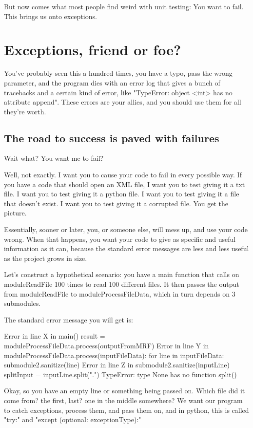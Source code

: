 \documentclass[10pt,a4paper]{article}
\begin{document}
But now comes what most people find weird with unit testing: You want to fail. This brings us onto exceptions.

\section{Exceptions, friend or foe?}

You've probably seen this a hundred times, you have a typo, pass the wrong parameter, and the program dies with an error log that gives a bunch of tracebacks and a certain kind of error, like "TypeError: object <int> has no attribute append". These errors are your allies, and you should use them for all they're worth. 

\subsection{The road to success is paved with failures}

Wait what? You want me to fail?

Well, not exactly. I want you to cause your code to fail in every possible way. If you have a code that should open an XML file, I want you to test giving it a txt file. I want you to test giving it a python file. I want you to test giving it a file that doesn't exist. I want you to test giving it a corrupted file. You get the picture.

Essentially, sooner or later, you, or someone else, will mess up, and use your code wrong. When that happens, you want your code to give as specific and useful information as it can, because the standard error messages are less and less useful as the project grows in size.

Let's construct a hypothetical scenario:
you have a main function that calls on moduleReadFile 100 times to read 100 different files. It then passes the output from moduleReadFile to moduleProcessFileData, which in turn depends on 3 submodules. 

The standard error message you will get is: %

Error in line X in main()
  result = moduleProcessFileData.process(outputFromMRF)
Error in line Y in moduleProcessFileData.process(inputFileData):
  for line in inputFileData:
    submodule2.sanitize(line)
Error in line Z in submodule2.sanitize(inputLine)
  splitInput = inputLine.split(".")
TypeError: type None has no function split()

Okay, so you have an empty line or something being passed on. Which file did it come from? the first, last? one in the middle somewhere? We want our program to catch exceptions, process them, and pass them on, and in python, this is called "try:" and "except (optional: exceptionType):"
\end{document}
